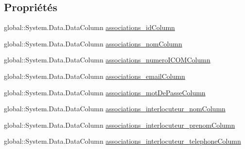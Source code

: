 \subsection*{Propriétés}
\begin{DoxyCompactItemize}
\item 
global\+::\+System.\+Data.\+Data\+Column \hyperlink{classforma_1_1formadb_data_set_1_1associations_data_table_a1031d8b3119aa0a6dd0abbf13a76d6a4}{associations\+\_\+id\+Column}
\item 
global\+::\+System.\+Data.\+Data\+Column \hyperlink{classforma_1_1formadb_data_set_1_1associations_data_table_a47f271d677cc5084ef08cdf39e2ed605}{associations\+\_\+nom\+Column}
\item 
global\+::\+System.\+Data.\+Data\+Column \hyperlink{classforma_1_1formadb_data_set_1_1associations_data_table_ad389b73d753ea2e406360b2a187c9e82}{associations\+\_\+numero\+I\+C\+O\+M\+Column}
\item 
global\+::\+System.\+Data.\+Data\+Column \hyperlink{classforma_1_1formadb_data_set_1_1associations_data_table_af4059c30c29051f478b54e125eb97bc4}{associations\+\_\+email\+Column}
\item 
global\+::\+System.\+Data.\+Data\+Column \hyperlink{classforma_1_1formadb_data_set_1_1associations_data_table_ac968fbd544cb60353c1641d9ae30ef3b}{associations\+\_\+mot\+De\+Passe\+Column}
\item 
global\+::\+System.\+Data.\+Data\+Column \hyperlink{classforma_1_1formadb_data_set_1_1associations_data_table_a0d738ce020a1c0b21e1ff6307adb37af}{associations\+\_\+interlocuteur\+\_\+nom\+Column}
\item 
global\+::\+System.\+Data.\+Data\+Column \hyperlink{classforma_1_1formadb_data_set_1_1associations_data_table_a8aad3149d17d7dd87edbd5f12e482596}{associations\+\_\+interlocuteur\+\_\+prenom\+Column}
\item 
global\+::\+System.\+Data.\+Data\+Column \hyperlink{classforma_1_1formadb_data_set_1_1associations_data_table_a0b210be0928aed8e52ef4903a8c25d32}{associations\+\_\+interlocuteur\+\_\+telephone\+Column}

\end{DoxyCompactItemize}
